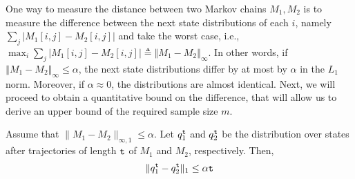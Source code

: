 One way to measure the distance between two Markov chains $M_{1},M_{2}$
is to measure the difference between the next state distributions
of each $i$, namely 
$\sum_{j}\left|M_{1}\left[i,j\right]-M_{2}\left[i,j\right]\right|$
and take the worst case, i.e., $\max_{i}\sum_{j}\left|M_{1}\left[i,j\right]-M_{2}\left[i,j\right]\right|\triangleq\left\Vert M_{1}-M_{2}\right\Vert _{\infty}$.
In other words, if $\left\Vert M_{1}-M_{2}\right\Vert _{\infty}\leq\alpha$,
the next state distributions differ by at most by $\alpha$ in the
$L_{1}$ norm. Moreover, if $\alpha\approx0$, the distributions are
almost identical.
Next, we will proceed to obtain a quantitative bound on the difference,
that will allow us to derive an upper bound of the required sample
size $m$.


\begin{theorem}
\label{thm:l1-error}
%
Assume that $\|M_1-M_2\|_{\infty,1}\leq \alpha$.
%
Let $q_1^{\tt t}$ and $q_2^{\tt t}$ be the distribution over states
after trajectories  of length ${\tt t}$ of $M_1$ and $M_2$,
respectively. Then,
\[
\|q_1^{\tt t}-q_2^{\tt t}\|_1\leq \alpha  {\tt t}
\]
\end{theorem}

